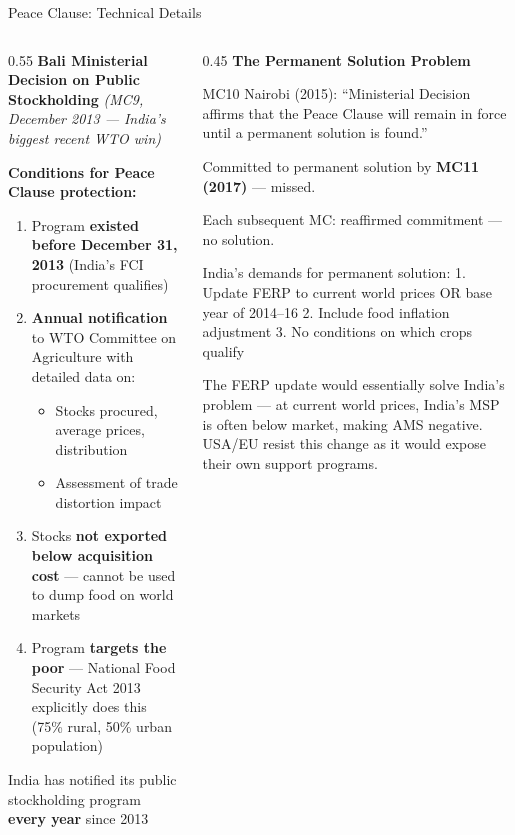 \documentclass[
  ignorenonframetext,
  aspectratio=169,
]{beamer}
\makeatletter
\providecommand{\tightlist}{%
  \setlength{\itemsep}{0pt}\setlength{\parskip}{0pt}}
\let\quarto@originallabel\label
\DeclareRobustCommand*{\label}[1]{\quarto@originallabel{#1}}
\makeatother
\begin{document}
\begin{frame}{Peace Clause: Technical Details}
\label{peace-clause-technical-details}
\begin{columns}[T]
\begin{column}{0.55\linewidth}
\textbf{Bali Ministerial Decision on Public Stockholding} \emph{(MC9,
December 2013 --- India's biggest recent WTO win)}

\textbf{Conditions for Peace Clause protection:}

\begin{enumerate}
\tightlist
\item
  Program \textbf{existed before December 31, 2013} (India's FCI
  procurement qualifies)
\item
  \textbf{Annual notification} to WTO Committee on Agriculture with
  detailed data on:

  \begin{itemize}
  \tightlist
  \item
    Stocks procured, average prices, distribution
  \item
    Assessment of trade distortion impact
  \end{itemize}
\item
  Stocks \textbf{not exported below acquisition cost} --- cannot be used
  to dump food on world markets
\item
  Program \textbf{targets the poor} --- National Food Security Act 2013
  explicitly does this (75\% rural, 50\% urban population)
\end{enumerate}

India has notified its public stockholding program \textbf{every year}
since 2013
\end{column}

\begin{column}{0.45\linewidth}
\textbf{The Permanent Solution Problem}

MC10 Nairobi (2015): ``Ministerial Decision affirms that the Peace
Clause will remain in force until a permanent solution is found.''

Committed to permanent solution by \textbf{MC11 (2017)} --- missed.

Each subsequent MC: reaffirmed commitment --- no solution.

India's demands for permanent solution: 1. Update FERP to current world
prices OR base year of 2014--16 2. Include food inflation adjustment 3.
No conditions on which crops qualify

The FERP update would essentially solve India's problem --- at current
world prices, India's MSP is often below market, making AMS negative.
USA/EU resist this change as it would expose their own support programs.
\end{column}
\end{columns}
\end{frame}
\end{document}
